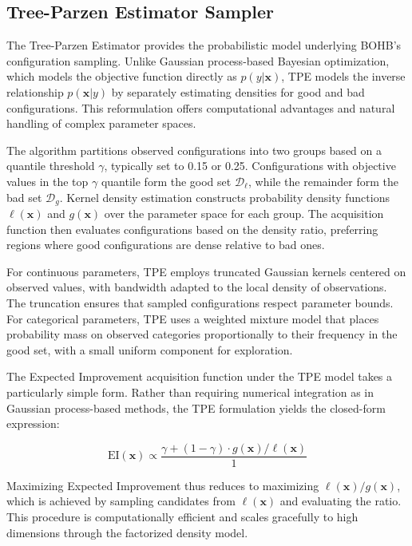 \subsection{Tree-Parzen Estimator Sampler}
\label{subsec:tpe}

The Tree-Parzen Estimator provides the probabilistic model underlying BOHB's configuration sampling. Unlike Gaussian process-based Bayesian optimization, which models the objective function directly as $p(y | \mathbf{x})$, TPE models the inverse relationship $p(\mathbf{x} | y)$ by separately estimating densities for good and bad configurations. This reformulation offers computational advantages and natural handling of complex parameter spaces.

The algorithm partitions observed configurations into two groups based on a quantile threshold $\gamma$, typically set to 0.15 or 0.25. Configurations with objective values in the top $\gamma$ quantile form the good set $\mathcal{D}_\ell$, while the remainder form the bad set $\mathcal{D}_g$. Kernel density estimation constructs probability density functions $\ell(\mathbf{x})$ and $g(\mathbf{x})$ over the parameter space for each group. The acquisition function then evaluates configurations based on the density ratio, preferring regions where good configurations are dense relative to bad ones.

For continuous parameters, TPE employs truncated Gaussian kernels centered on observed values, with bandwidth adapted to the local density of observations. The truncation ensures that sampled configurations respect parameter bounds. For categorical parameters, TPE uses a weighted mixture model that places probability mass on observed categories proportionally to their frequency in the good set, with a small uniform component for exploration.

The Expected Improvement acquisition function under the TPE model takes a particularly simple form. Rather than requiring numerical integration as in Gaussian process-based methods, the TPE formulation yields the closed-form expression:

\begin{equation}
\text{EI}(\mathbf{x}) \propto \frac{\gamma + (1-\gamma) \cdot g(\mathbf{x})/\ell(\mathbf{x})}{1}
\end{equation}

Maximizing Expected Improvement thus reduces to maximizing $\ell(\mathbf{x})/g(\mathbf{x})$, which is achieved by sampling candidates from $\ell(\mathbf{x})$ and evaluating the ratio. This procedure is computationally efficient and scales gracefully to high dimensions through the factorized density model.

